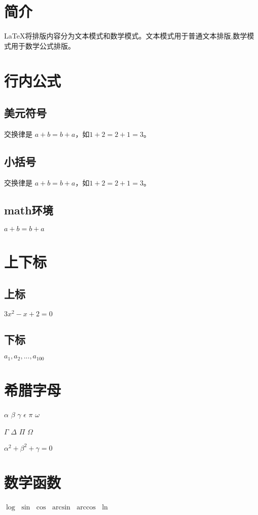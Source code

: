 \documentclass{ctexart}
\begin{document}
    \section{简介}
    \LaTeX 将排版内容分为文本模式和数学模式。文本模式用于普通文本排版,数学模式用于数学公式排版。

    \section{行内公式}
    \subsection{美元符号}
    交换律是 $a+b=b+a$，如$1+2=2+1=3$。
    \subsection{小括号}
    交换律是 \(a+b=b+a\)，如\(1+2=2+1=3\)。
    \subsection{math环境}
    \begin{math}a+b=b+a\end{math}

    \section{上下标}
    \subsection{上标}
    $3x^2-x+2=0$
    \subsection{下标}
    $a_1,a_2,...,a_100$

    \section{希腊字母}
    $\alpha$
    $\beta$
    $\gamma$
    $\epsilon$
    $\pi$
    $\omega$

    $\Gamma$
    $\Delta$
    $\Pi$
    $\Omega$

    $\alpha^2 + \beta^2 + \gamma = 0$
    \section{数学函数}
    $\log$
    $\sin$
    $\cos$
    $\arcsin$
    $\arccos$
    $\ln$
\end{document}

